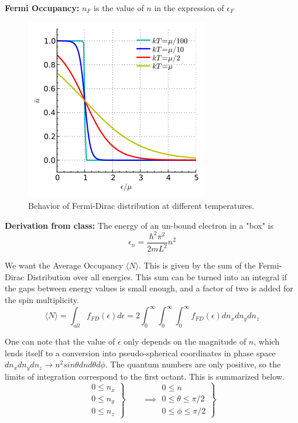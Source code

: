 \textbf{Fermi Occupancy:} $n_F$ is the value of $n$ in the expression of $\epsilon_F$
\begin{figure}[!hbtp]
    \centering
    \includegraphics[scale=.2645]{Images/FD-dis.png}
    \caption{Behavior of Fermi-Dirac distribution at different temperatures.}
    \label{fig:fd-dis}
\end{figure}

\newpage
\textbf{Derivation from class:}
The energy of an un-bound electron in a "box" is 
\[
\epsilon_n = \frac{\hbar^2\pi^2}{2mL^2} n^2
\]

We want the Average Occupancy $\langle N \rangle$. This is given by the sum of the Fermi-Dirac Distribution over all energies. This sum can be turned into an integral if the gaps between energy values is small enough, and a factor of two is added for the spin multiplicity.
\[
\langle N \rangle = \int_{all} f_{FD}(\epsilon) d\epsilon 
= 2 \int_0^{\infty} \int_0^{\infty} \int_0^{\infty} f_{FD}(\epsilon) dn_x dn_y dn_z
\]

One can note that the value of $\epsilon$ only depends on the magnitude of $n$, which lends itself to a conversion into pseudo-spherical coordinates in phase space $dn_x dn_y dn_z \to n^2 sin\theta dn d\theta d\phi$. The quantum numbers are only positive, so the limits of integration correspond to the first octant. This is summarized below.
\[
    \left. \begin{aligned}
        0 \leq n_x \\
        0 \leq n_y \\
        0 \leq n_z
    \end{aligned}
    \right \}
\qquad
\implies
    \left. \begin{aligned}
        0 \leq n \\
        0 \leq \theta \leq \pi/2 \\
        0 \leq \phi \leq \pi/2
    \end{aligned}
    \right \}
\]

